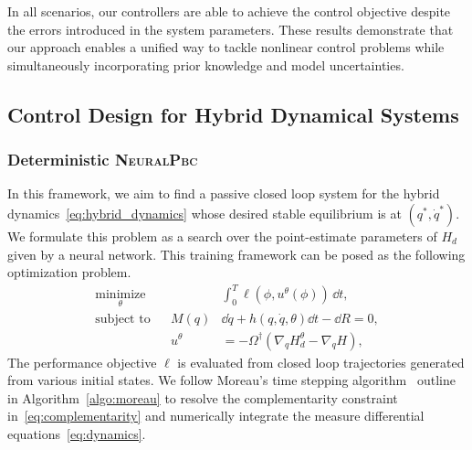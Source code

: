 In all scenarios, our controllers are able to achieve the control objective
despite the errors introduced in the system parameters.
%
%
These results demonstrate that our approach enables a unified way to tackle
nonlinear control problems while simultaneously incorporating prior knowledge
and model uncertainties.
%
  

\subsection{Control Design for Hybrid Dynamical Systems}

\subsubsection{Deterministic \textsc{NeuralPbc}}
\label{sssec:data_driven_neuralpbc}

In this framework, we aim to find a passive closed loop system for the hybrid
dynamics~\eqref{eq:hybrid_dynamics} whose desired stable equilibrium is at
$(q^*, \dot{q}^*)$.
%
We formulate this problem as a search over the point-estimate parameters of
$H_d$ given by a neural network.
%
This training framework can be posed as the following optimization problem. 
\begin{equation}
    \begin{aligned}
        \underset{\theta}{\textrm{minimize}} 
        & & &\int_{0}^{T} \ell \left(\phi,u^{\theta}(\phi) \right) \, \dd t , \\%
        \textrm{subject to}
        & & M(q) &\dd \dot{q} + h(q, \dot{q}, \theta)\dd t - \dd R  = 0,\\%
        & & u^{\theta} &= -\Omega^{\dagger} (\nabla_q H_d^{\theta} - \nabla_q H),%
    \end{aligned}
    \label{eq:hybrid_neuralpbc}
\end{equation}
%
The performance objective $\ell$ is evaluated from closed loop trajectories
generated from various initial states.
%
We follow Moreau's time stepping algorithm~\cite{glocker2005formulation} outline
in Algorithm~\eqref{algo:moreau} to resolve the complementarity constraint
in~\eqref{eq:complementarity} and numerically integrate the measure differential
equations~\eqref{eq:dynamics}.
%

